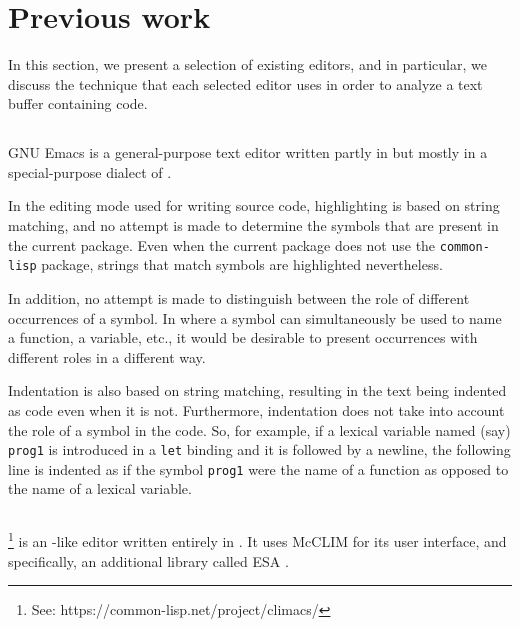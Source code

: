 \section{Previous work}

In this section, we present a selection of existing editors, and in
particular, we discuss the technique that each selected editor uses in
order to analyze a text buffer containing \commonlisp{} code.

\subsection{\emacs{}}
\label{sec-previous-emacs}

GNU Emacs \cite{Finseth:1980:TPTa,CraftOfTextEditiing} is a
general-purpose text editor written partly in \clanguage{} but mostly
in a special-purpose dialect of \lisp{}
\cite{GNUEmacsLispReferenceManual}.

In the editing mode used for writing \commonlisp{} source code,
highlighting is based on string matching, and no attempt is made to
determine the symbols that are present in the current package.  Even
when the current package does not use the \texttt{common-lisp}
package, strings that match \commonlisp{} symbols are highlighted
nevertheless.

In addition, no attempt is made to distinguish between the role of
different occurrences of a symbol.  In \commonlisp{} where a symbol
can simultaneously be used to name a function, a variable, etc., it
would be desirable to present occurrences with different roles in a
different way.

Indentation is also based on string matching, resulting in the text
being indented as \commonlisp{} code even when it is not.
Furthermore, indentation does not take into account the role of a
symbol in the code.  So, for example, if a lexical variable named
(say) \texttt{prog1} is introduced in a \texttt{let} binding and
it is followed by a newline, the following line is indented as if the
symbol \texttt{prog1} were the name of a \commonlisp{} function as
opposed to the name of a lexical variable.

\subsection{\climacs{}}

\climacs%
\footnote{See: https://common-lisp.net/project/climacs/}
is an \emacs{}-like editor written entirely in \commonlisp{}.  It uses
McCLIM \cite{Strandh:2002:ILC:McCLIM}
for its user interface, and specifically, an additional library called
ESA \cite{Strandh:2007:ECL:1622123.1622150}.

